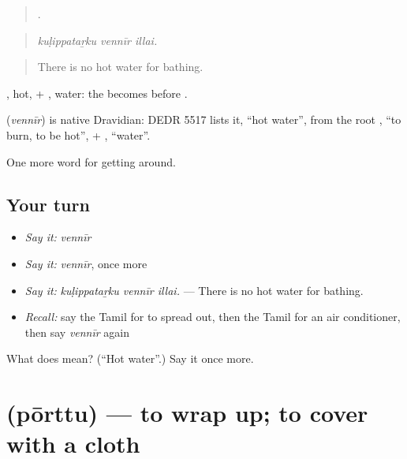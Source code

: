 \begin{quote}
  .
\end{quote}

\begin{quote}
\emph{kuḷippataṟku vennīr illai.}
\end{quote}

\begin{quote}
There is no hot water for bathing.
\end{quote}

, hot, + , water: the  becomes  before .

\begin{cousinweb}
\textbf{} (\emph{vennīr}) is native Dravidian: DEDR 5517 lists it, \textquotedblleft{}hot water\textquotedblright{}, from the root , \textquotedblleft{}to burn, to be hot\textquotedblright{}, + , \textquotedblleft{}water\textquotedblright{}.
\end{cousinweb}

\begin{grammarlens}[title={What you've built}]
One more word for getting around.
\end{grammarlens}

\subsection*{Your turn}
\begin{itemize}
\raggedright
  \item \emph{Say it:} \emph{vennīr}
  \item \emph{Say it:} \emph{vennīr}, once more
  \item \emph{Say it:} \emph{kuḷippataṟku vennīr illai.} — There is no hot water for bathing.
  \item \emph{Recall:} say the Tamil for to spread out, then the Tamil for an air conditioner, then say \emph{vennīr} again
\end{itemize}

\begin{tcolorbox}[breakable,colback=teal!4,colframe=teal!35!black,title={Before you move on}]
What does  mean? (\textquotedblleft{}Hot water\textquotedblright{}.) Say it once more.
\end{tcolorbox}
\section[\texorpdfstring{\ta{போர்த்து} (pōrttu)}{போர்த்து (pōrttu)}]{ (pōrttu) — to wrap up; to cover with a cloth}

